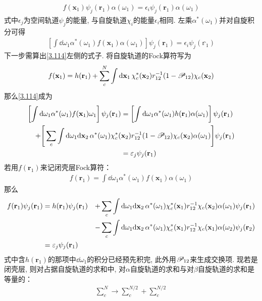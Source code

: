 \begin{align}
	f(\mathbf{x}_1)\psi_j(\mathbf{r}_1)\alpha(\omega_1) = \epsilon_i\psi_j(\mathbf{r}_1)\alpha(\omega_1)
\end{align}
式中$\epsilon_j$为空间轨道$\psi_j$的能量, 
与自旋轨道$\chi_i$的能量$\epsilon_i$相同. 
左乘$\alpha^*(\omega_1)$并对自旋积分可得
\begin{align}
	\label{3.114}
	\left[ \int\dd\omega_1\alpha^*(\omega_1)f(\mathbf{x}_1)\alpha(\omega_1) \right]\psi_j(\mathbf{r}_1) = \epsilon_i\psi_j(\mathbb{r}_1)
\end{align}
下一步需算出\eqref{3.114}左侧的式子. 
将自旋轨道的Fock算符写为
\begin{align}
	f(\mathbf{x}_1) = h(\mathbf{r}_1) + \sum_c^N\int\dd{x}_1\,\chi_c^*(\mathbf{x}_2)\twoe(1-\scr{P}_{12})\chi_c(\mathbf{x}_2)
\end{align}
那么\eqref{3.114}成为
\begin{align}
	\left[ \int\dd\omega_1\alpha^*(\omega_1)f(\mathbf{x}_1)\omega_1 \right]\psi_j(\mathbf{r}_1) &= \left[ \int\dd\omega_1\alpha^*(\omega_1)h(\mathbf{r}_1)\alpha(\omega_1) \right]\psi_j(\mathbf{r}_1) \notag\\
	+\Bigg[ \sum_c\int\dd\omega_1\dd{x}_2\,\alpha^*(\omega_1)\chi_c^*(&\mathbf{x}_2)\twoe(1-\scr{P}_{12})\chi_c(\mathbf{x}_2)\alpha(\omega_1) \Bigg]\psi_j(\mathbf{r}_1)  \notag\\
	& = \epsilon_j\psi_j(\mathbf{r}_1)
\end{align}
若用$f(\mathbf{r}_1)$来记闭壳层Fock算符：
\begin{align}
	f(\mathbf{r}_1) = \int\dd\omega_1\alpha^*(\omega_1)f(\mathbf{x}_1)\alpha(\omega_1)
\end{align}
那么
\begin{alignat}{3}
	f(\mathbf{r}_1)\psi_j(\mathbf{r}_1) &= h(\mathbf{r}_1)\psi_j(\mathbf{r}_1) &+ \sum_c\int\dd\omega_1\dd{x}_2\,\alpha^*(\omega_1)\chi_c^*(\mathbf{x}_1)\twoe\chi_c(\mathbf{x}_2)\alpha(\omega_1)\psi_j(\mathbf{r}_1)\notag\\
	&&-\sum_c\int\dd\omega_1\dd{x}_2\,\alpha^*(\omega_1)\chi_c^*(\mathbf{x}_1)\twoe\chi_c(\mathbf{x}_1)\alpha(\omega_2)\psi_j(\mathbf{r}_2)\notag\\
	&=\epsilon_j\psi_j(\mathbf{r}_1)&
\end{alignat}
式中含$h(\mathbf{r}_1)$的那项中$\dd\omega_1$的积分已经预先积完, 
此外用$\mathscr{P}_{12}$来生成交换项. 
现若是闭壳层, 
则对占据自旋轨道的求和中, 
对$\alpha$自旋轨道的求和与对$\beta$自旋轨道的求和是等量的：
\begin{align}
	\sum_c^N\to \sum_c^{N/2} + \sum_c^{N/2}
\end{align}
